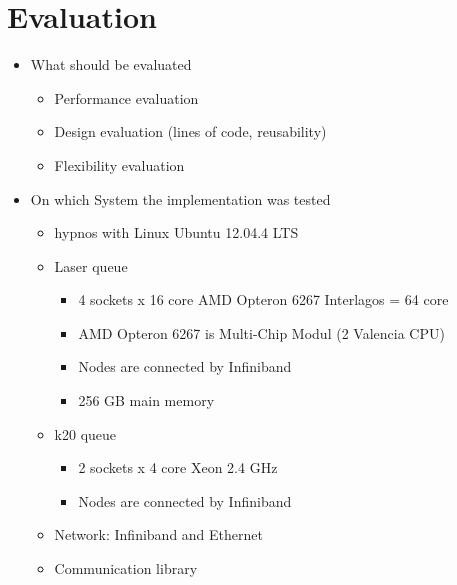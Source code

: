 \chapter{Evaluation}
\label{sec:evaluation}



\begin{itemize}

\item What should be evaluated
  \begin{itemize}
  \item Performance evaluation
  \item Design evaluation (lines of code, reusability)
  \item Flexibility evaluation
  \end{itemize}

\item On which System the implementation was tested
  \begin{itemize}
  \item hypnos with Linux Ubuntu 12.04.4 LTS
  \item Laser queue
    \begin{itemize}
    \item 4 sockets x 16 core AMD Opteron 6267 Interlagos = 64 core 
    \item AMD Opteron 6267 is Multi-Chip Modul (2 Valencia CPU)
    \item Nodes are connected by Infiniband
    \item 256 GB main memory
    \end{itemize}
  \item k20 queue
    \begin{itemize}
    \item 2 sockets x 4 core Xeon 2.4 GHz
    \item Nodes are connected by Infiniband
    \end{itemize}
  \item Network: Infiniband and Ethernet
  \item Communication library
  \end{itemize}


\end{itemize}
